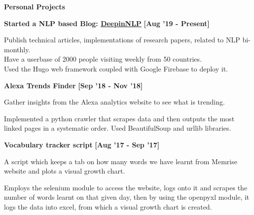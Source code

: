 \documentclass[a4paper,10pt]{article}
\begin{document}
\colorbox{titleColor}{\parbox{6.7in}{\textbf{Personal Projects}}}


\begin{itemize*}
  \setlength{\itemsep}{1pt}
  \item \textbf{\small{Started a NLP based Blog: \href{https://deeps.site}{DeepinNLP}}} \hfill {\small{{\textbf{[Aug '19 - Present]}}}\/} 
\begin{itemize*}
	\item Publish technical articles, implementations of research papers, related to NLP bi-monthly. \\Have a userbase of 2000 people visiting weekly from 50 countries. 
	\\Used the Hugo web framework coupled with Google Firebase to deploy it.
	
\end{itemize*}
\end{itemize*}



\begin{itemize*}
  \setlength{\itemsep}{1pt}
  \item \textbf{\small{Alexa Trends Finder}} \hfill {\small{{\textbf{[Sep '18 - Nov '18]}}}\/} 
\begin{itemize*}
	\item Gather insights from the Alexa analytics website to see what is trending.
	\item Implemented a python crawler that scrapes data and then outputs the most linked pages in a systematic order. Used BeautifulSoup and urllib libraries.
\end{itemize*}
\end{itemize*}

%	


\begin{itemize*}
  \setlength{\itemsep}{1pt}
  \item \textbf{\small{Vocabulary tracker script}} \hfill {\small{{\textbf{[Aug '17 - Sep '17]}}}\/} 
\begin{itemize*}
	\item A script which keeps a tab on how many words we have learnt from Memrise website and plots a visual growth chart.
	\item Employs the selenium module to access the website, logs onto it and scrapes the number of words learnt on that given day, then by using the openpyxl module, it logs the data into excel, from which a visual growth chart is created.
\end{itemize*}
\end{itemize*}
\end{document}
